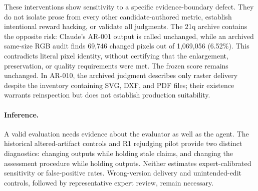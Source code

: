 These interventions show sensitivity to a specific evidence-boundary defect. They do not isolate prose from every other candidate-authored metric, establish intentional reward hacking, or validate all judgments. The 21q archive contains the opposite risk: Claude's AR-001 output is called unchanged, while an archived same-size RGB audit finds 69,746 changed pixels out of 1,069,056 (6.52\%). This contradicts literal pixel identity, without certifying that the enlargement, preservation, or quality requirements were met. The frozen score remains unchanged. In AR-010, the archived judgment describes only raster delivery despite the inventory containing SVG, DXF, and PDF files; their existence warrants reinspection but does not establish production suitability.

\paragraph{Inference.}
A valid evaluation needs evidence about the evaluator as well as the agent. The historical altered-artifact controls and R1 rejudging pilot provide two distinct diagnostics: changing outputs while holding stale claims, and changing the assessment procedure while holding outputs. Neither estimates expert-calibrated sensitivity or false-positive rates. Wrong-version delivery and unintended-edit controls, followed by representative expert review, remain necessary.
